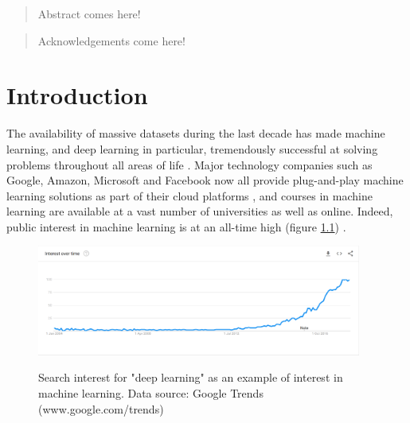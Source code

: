 \documentclass[12pt, titlepage]{report}
\theoremstyle{definition}
\begin{document}

\begin{abstract}
Abstract comes here!
\end{abstract}


\renewcommand{\abstractname}{Acknowledgements}
\begin{abstract}
Acknowledgements come here!
\end{abstract}



\tableofcontents
\clearpage



\chapter{Introduction}
The availability of massive datasets during the last decade has made machine learning, and deep learning in particular, tremendously successful at solving problems throughout all areas of life \cite{russel2009artificial}. Major technology companies such as Google, Amazon, Microsoft and Facebook now all provide plug-and-play machine learning solutions as part of their cloud platforms \cite{google2018automl} \cite{amazon2018aws} \cite{microsoft2018azure}, and courses in machine learning are available at a vast number of universities as well as online. Indeed, public interest in machine learning is at an all-time high (figure \ref{figure:googletrends_dl}) \cite{forbes2016short}.

\begin{figure}
\centering
\includegraphics[width=0.95\textwidth]{img/google_trends_dl.png}\\
\caption{Search interest for "deep learning" as an example of interest in machine learning. Data source: Google Trends (www.google.com/trends) \cite{google2018trends}}
\label{figure:googletrends_dl}
\end{figure}
\end{document}
